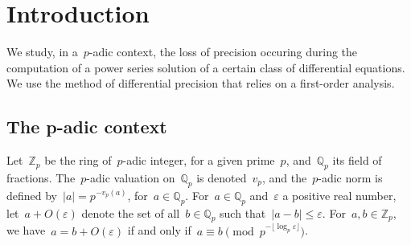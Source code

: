 \documentclass{sig-alternate}
\theoremstyle{definition}
\theoremstyle{remark}
\newcommand{\Zp}{\mathbb{Z}_p}
\newcommand{\Q}{\mathbb{Q}}
\newcommand{\Qp}{\Q_p}
\newcommand\padic{$p$-adic\xspace}
\def\leq{\leqslant}
\begin{document}

\printccsdesc





\section{Introduction}
\label{section:presentation-equa-diff}

We study, in a~$p$-adic context, the loss of precision occuring during the
computation of a power series solution of a certain class of differential
equations. We use the method of differential precision that relies on a
first-order analysis.

\subsection{The {\subsecit p}-adic context}

Let~$\Zp$ be the ring of~$p$-adic integer, for a given prime~$p$, and~$\Qp$ its
field of fractions. The~\padic valuation on~$\Qp$ is denoted~$v_p$, and
the~\padic norm is defined by~$|a| = p^{-v_p(a)}$, for~$a\in\Qp$.
For~$a\in\Qp$ and~$\varepsilon$ a positive real number,
let~$a+O(\varepsilon)$ denote the set of all~$b\in\Qp$ such that~$|a-b|\leq
\varepsilon$. For~$a,b\in\Zp$, we have~$a = b + O(\varepsilon)$ if and only if~$a\equiv b
\pmod{p^{-\lfloor \log_p \varepsilon \rfloor}}$.
\end{document}
